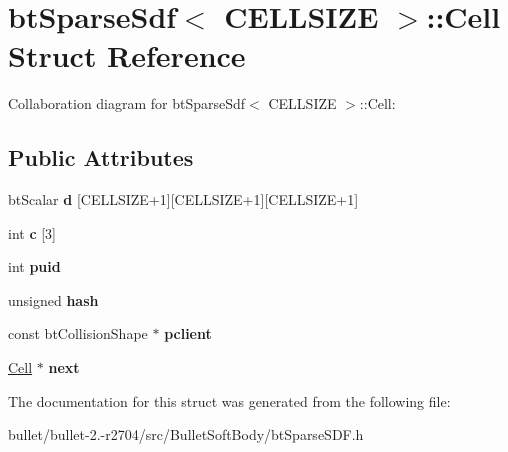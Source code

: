 \hypertarget{structbt_sparse_sdf_1_1_cell}{\section{bt\+Sparse\+Sdf$<$ C\+E\+L\+L\+S\+I\+Z\+E $>$\+:\+:Cell Struct Reference}
\label{structbt_sparse_sdf_1_1_cell}
}


Collaboration diagram for bt\+Sparse\+Sdf$<$ C\+E\+L\+L\+S\+I\+Z\+E $>$\+:\+:Cell\+:
\subsection*{Public Attributes}
\begin{DoxyCompactItemize}
\item 
\hypertarget{structbt_sparse_sdf_1_1_cell_a67b650b7a70623b8e84f26bcbfb4c4de}{bt\+Scalar {\bfseries d} \mbox{[}C\+E\+L\+L\+S\+I\+Z\+E+1\mbox{]}\mbox{[}C\+E\+L\+L\+S\+I\+Z\+E+1\mbox{]}\mbox{[}C\+E\+L\+L\+S\+I\+Z\+E+1\mbox{]}}\label{structbt_sparse_sdf_1_1_cell_a67b650b7a70623b8e84f26bcbfb4c4de}

\item 
\hypertarget{structbt_sparse_sdf_1_1_cell_a3d48e2ebb4a8ff208de9601eb5ec175a}{int {\bfseries c} \mbox{[}3\mbox{]}}\label{structbt_sparse_sdf_1_1_cell_a3d48e2ebb4a8ff208de9601eb5ec175a}

\item 
\hypertarget{structbt_sparse_sdf_1_1_cell_afc8df81da8cb09983eb3ca7e44f06398}{int {\bfseries puid}}\label{structbt_sparse_sdf_1_1_cell_afc8df81da8cb09983eb3ca7e44f06398}

\item 
\hypertarget{structbt_sparse_sdf_1_1_cell_a636da43bb3d3330fe69589d963224773}{unsigned {\bfseries hash}}\label{structbt_sparse_sdf_1_1_cell_a636da43bb3d3330fe69589d963224773}

\item 
\hypertarget{structbt_sparse_sdf_1_1_cell_a2846059ca6c191326bf6897ed577130d}{const bt\+Collision\+Shape $\ast$ {\bfseries pclient}}\label{structbt_sparse_sdf_1_1_cell_a2846059ca6c191326bf6897ed577130d}

\item 
\hypertarget{structbt_sparse_sdf_1_1_cell_a1e8acdc986350cbd35cebba46b55c22d}{\hyperlink{structbt_sparse_sdf_1_1_cell}{Cell} $\ast$ {\bfseries next}}\label{structbt_sparse_sdf_1_1_cell_a1e8acdc986350cbd35cebba46b55c22d}

\end{DoxyCompactItemize}


The documentation for this struct was generated from the following file\+:\begin{DoxyCompactItemize}
\item 
bullet/bullet-\/2.-\/r2704/src/\+Bullet\+Soft\+Body/bt\+Sparse\+S\+D\+F.\+h\end{DoxyCompactItemize}

